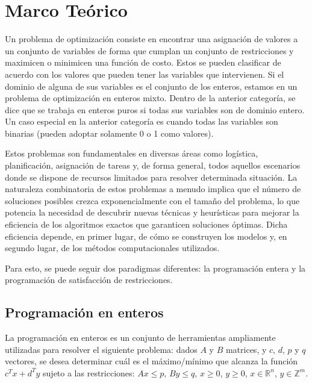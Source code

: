 \documentclass[12pt]{report}
\begin{document}
\chapter{Marco Teórico}

Un problema de optimización consiste en encontrar una asignación de valores a un conjunto de variables de forma que cumplan un conjunto de restricciones y maximicen o minimicen una función de costo. Estos se pueden clasificar de acuerdo con los valores que pueden tener las variables que intervienen. Si el dominio de alguna de sus variables es el conjunto de los enteros, estamos en un problema de optimización en enteros mixto. Dentro de la anterior categoría, se dice que se trabaja en enteros puros si todas sus variables son de dominio entero. Un caso especial en la anterior categoría es cuando todas las variables son binarias (pueden adoptar solamente 0 o 1 como valores).

Estos problemas son fundamentales en diversas áreas como logística, planificación, asignación de tareas y, de forma general, todos aquellos escenarios donde se dispone de recursos limitados para resolver determinada situación. La naturaleza combinatoria de estos problemas a menudo implica que el número de soluciones posibles crezca exponencialmente con el tamaño del problema, lo que potencia la necesidad de descubrir nuevas técnicas y heurísticas para mejorar la eficiencia de los algoritmos exactos que garanticen soluciones óptimas. Dicha eficiencia depende, en primer lugar, de cómo se construyen los modelos y, en segundo lugar, de los métodos computacionales utilizados. 

Para esto, se puede seguir dos paradigmas diferentes: la programación entera y la programación de satisfacción de restricciones.

\section{Programación en enteros}

La programación en enteros es un conjunto de herramientas ampliamente utilizadas para resolver el siguiente problema: dados $A$ y $B$ matrices, y $c$, $d$, $p$ y $q$ vectores, se desea determinar cuál es el máximo/mínimo que alcanza la función $c^Tx+d^Ty$ sujeto a las restricciones: $Ax\leq p$, $By\leq q$, $x\geq 0$, $y\geq 0$, $x\in \mathbb{R} ^n$, $y\in \mathbb{Z}^m$.  
\end{document}
